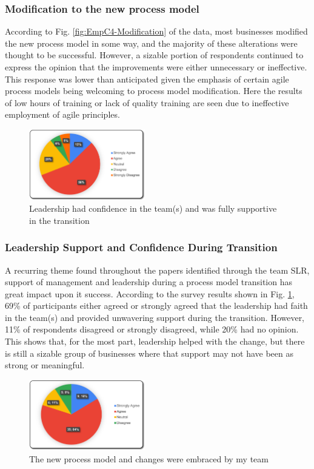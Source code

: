 \documentclass[conference]{IEEEtran}
\begin{document}
\subsubsection{Modification to the new process model}
According to Fig. \ref{fig:EmpC4-Modification} of the data, most businesses modified the new process model in some way, and the majority of these alterations were thought to be successful. However, a sizable portion of respondents continued to express the opinion that the improvements were either unnecessary or ineffective. This response was lower than anticipated given the emphasis of certain agile process models being welcoming to process model modification\cite{6615211}. Here the results of low hours of training or lack of quality training are seen due to ineffective employment of agile principles.
\begin{figure}[H]
    \centering
    \includegraphics[width=0.45\textwidth]{images/EmpC5-LeaderConfidence}
    \caption{Leadership had confidence in the team(s) and was fully supportive in the transition}
    \label{fig:EmpC5-LeaderConfidence}
\end{figure}
\subsubsection{Leadership Support and Confidence During Transition}
A recurring theme found throughout the papers identified through the team SLR, support of management and leadership during a process model transition has great impact upon it success\cite{7765512}. According to the survey results shown in Fig. \ref{fig:EmpC5-LeaderConfidence}, 69\% of participants either agreed or strongly agreed that the leadership had faith in the team(s) and provided unwavering support during the transition. However, 11\% of respondents disagreed or strongly disagreed, while 20\% had no opinion. This shows that, for the most part, leadership helped with the change, but there is still a sizable group of businesses where that support may not have been as strong or meaningful.
\begin{figure}[H]
    \centering
    \includegraphics[width=0.45\textwidth]{images/EmpC6-EmbracingChange}
    \caption{The new process model and changes were embraced by my team}
    \label{fig:EmpC6-EmbracingChange}
\end{figure}
\end{document}
